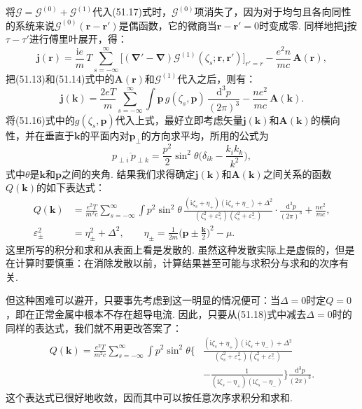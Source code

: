 将$\mathcal{G}=\mathcal{G}^{(0)}+\mathcal{G}^{(1)}$代入(51.17)式时，$\mathcal{G}^{(0)}$项消失了，因为对于均匀且各向同性的系统来说$\mathcal{G}^{(0)}(\bm{r}-\bm{r}')$是偶函数，它的微商当$\bm{r}-\bm{r}'=0$时变成零. 同样地把$\bm{j}$按$\tau-\tau'$进行傅里叶展开，得：
\begin{equation*}
\bm{j}(\bm{r})=\frac{\mathrm{i}e}{m}\,T\sum_{s=-\infty}^{\infty}
\bigl[(\bm{\nabla}'-\bm{\nabla})\mathcal{G}^{(1)}(\zeta_s;\bm{r},\bm{r}')\bigr]_{r'=r}
-\frac{e^2n}{mc}\,\bm{A}(\bm{r}),
\end{equation*}
把(51.13)和(51.14)式中的$\bm{A}(\bm{r})$和$\mathcal{G}^{(1)}$代入之后，则有：
\begin{equation*}
\bm{j}(\bm{k})=\frac{2eT}{m}\sum_{s=-\infty}^{\infty}\int
\bm{p}\,g(\zeta_s,\bm{p})\,\frac{\mathrm{d}^3p}{(2\pi)^3}
-\frac{ne^2}{mc}\,\bm{A}(\bm{k}).
\end{equation*}
将(51.16)式中的$g(\zeta_s,\bm{p})$代入上式，最好立即考虑矢量$\bm{j}(\bm{k})$和$\bm{A}(\bm{k})$的横向性，并在垂直于$\bm{k}$的平面内对$\bm{p}_{\perp}$的方向求平均，所用的公式为
\begin{equation*}
\overline{p_{\perp i}\,p_{\perp k}}=\frac{p^2}{2}\sin^2\theta
\biggl(\delta_{ik}-\frac{k_ik_k}{k^2}\biggr),
\end{equation*}
式中$\theta$是$\bm{k}$和$\bm{p}$之间的夹角. 结果我们求得确定$\bm{j}(\bm{k})$和$\bm{A}(\bm{k})$之间关系的函数$Q(\bm{k})$的如下表达式：
\begin{equation}
\begin{aligned}
Q(\bm{k})&=\frac{e^2T}{m^2c}\sum_{s=-\infty}^{\infty}\int p^2\sin^2\theta\,
\frac{(\mathrm{i}\zeta_s+\eta_+)(\mathrm{i}\zeta_s+\eta_-)+\Delta^2}
{(\zeta_s^2+\varepsilon_+^2)(\zeta_s^2+\varepsilon_-^2)}
\cdot\frac{\mathrm{d}^3p}{(2\pi)^3}+\frac{ne^2}{mc},\\
\varepsilon_\pm^2&=\eta_\pm^2+\Delta^2,\qquad
\eta_\pm=\frac{1}{2m}\biggl(\bm{p}\pm\frac{\bm{k}}{2}\biggr)^{\!2}-\mu.
\end{aligned}
\end{equation}
这里所写的积分和求和从表面上看是发散的. 虽然这种发散实际上是虚假的，但是在计算时要慎重：在消除发散以前，计算结果甚至可能与求积分与求和的次序有关.

但这种困难可以避开，只要事先考虑到这一明显的情况便可：当$\Delta=0$时定$Q=0$，即在正常金属中根本不存在超导电流. 因此，只要从(51.18)式中减去$\Delta=0$时的同样的表达式，我们就不用更改答案了：
\begin{equation}
\begin{aligned}
Q(\bm{k})=\frac{e^2T}{m^2c}\sum_{s=-\infty}^{\infty}\int p^2\sin^2\theta
\biggl\{&\frac{(\mathrm{i}\zeta_s+\eta_+)(\mathrm{i}\zeta_s+\eta_-)+\Delta^2}
{(\zeta_s^2+\varepsilon_+^2)(\zeta_s^2+\varepsilon_-^2)}\\
&-\frac{1}{(\mathrm{i}\zeta_s-\eta_+)(\mathrm{i}\zeta_s-\eta_-)}
\biggr\}\frac{\mathrm{d}^3p}{(2\pi)^3}.
\end{aligned}
\end{equation}
这个表达式已很好地收敛，因而其中可以按任意次序求积分和求和.

